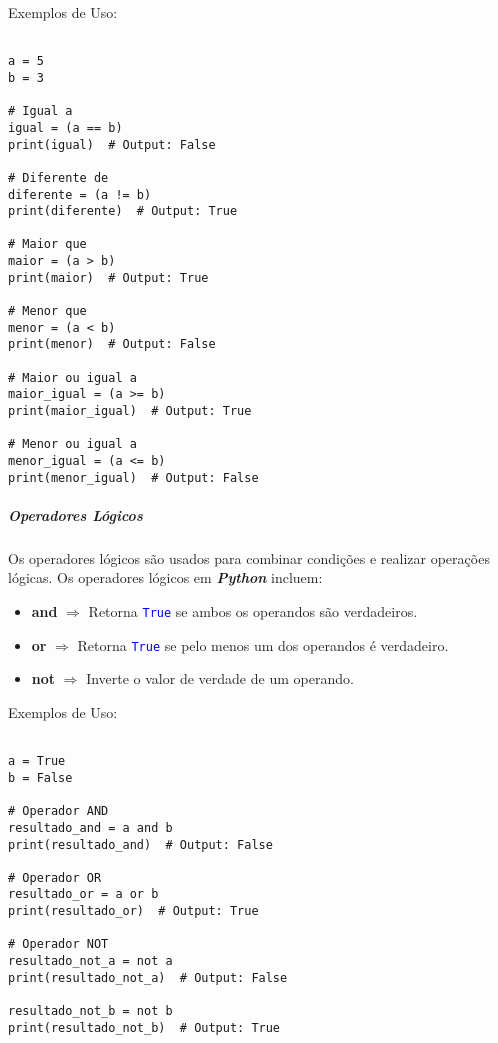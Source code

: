 \documentclass[a4paper, 12pt, onecolumn,singlespacing]{article}
\begin{document}
Exemplos de Uso:

\begin{verbatim}

a = 5
b = 3

# Igual a
igual = (a == b)
print(igual)  # Output: False

# Diferente de
diferente = (a != b)
print(diferente)  # Output: True

# Maior que
maior = (a > b)
print(maior)  # Output: True

# Menor que
menor = (a < b)
print(menor)  # Output: False

# Maior ou igual a
maior_igual = (a >= b)
print(maior_igual)  # Output: True

# Menor ou igual a
menor_igual = (a <= b)
print(menor_igual)  # Output: False

\end{verbatim}
	\subparagraph{Operadores Lógicos}
	\label{python_operadores_logicos}
	Os operadores lógicos são usados para combinar condições e realizar operações lógicas. Os operadores lógicos em \textbf{\textit{Python}} incluem:
	
	\begin{itemize}
		\item \textbf{and} $\Rightarrow$ Retorna \texttt{\textcolor{blue}{True}} se ambos os operandos são verdadeiros.
		\item \textbf{or} $\Rightarrow$ Retorna \texttt{\textcolor{blue}{True}}  se pelo menos um dos operandos é verdadeiro.
		\item \textbf{not} $\Rightarrow$ Inverte o valor de verdade de um operando.
	\end{itemize}

Exemplos de Uso:

\begin{verbatim}
	
a = True
b = False

# Operador AND
resultado_and = a and b
print(resultado_and)  # Output: False

# Operador OR
resultado_or = a or b
print(resultado_or)  # Output: True

# Operador NOT
resultado_not_a = not a
print(resultado_not_a)  # Output: False

resultado_not_b = not b
print(resultado_not_b)  # Output: True

\end{verbatim}
\end{document}

